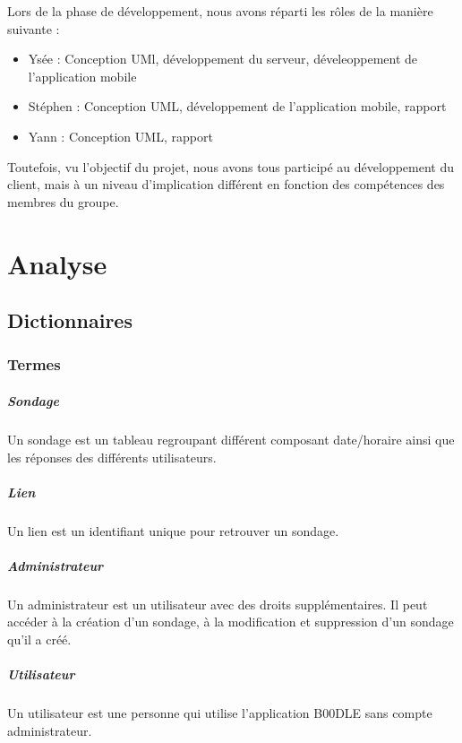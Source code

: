 \documentclass[titlepage]{report}
\begin{document}
\par Lors de la phase de développement, nous avons réparti les rôles de la manière suivante : \begin{itemize}
	\item Ysée : Conception UMl, développement du serveur, déveleoppement de l'application mobile
	\item Stéphen : Conception UML, développement de l'application mobile, rapport
	\item Yann : Conception UML, rapport
\end{itemize}
\par Toutefois, vu l'objectif du projet, nous avons tous participé au développement du client, mais à un niveau d'implication différent en fonction des compétences des membres du groupe.

\chapter{Analyse}
\section{Dictionnaires}
\subsection{Termes}


\paragraph{Sondage} Un sondage est un tableau regroupant différent composant date/horaire ainsi que les réponses des différents utilisateurs.
\paragraph{Lien} Un lien est un identifiant unique pour retrouver un sondage.
\paragraph{Administrateur} Un administrateur est un utilisateur avec des droits supplémentaires. Il peut accéder à la création d’un sondage, à la modification et suppression d’un sondage qu’il a créé.
\paragraph{Utilisateur} Un utilisateur est une personne qui utilise l’application B00DLE sans compte administrateur.
\end{document}
